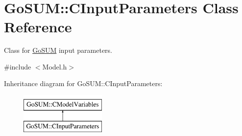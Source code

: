 \hypertarget{class_go_s_u_m_1_1_c_input_parameters}{\section{Go\-S\-U\-M\-:\-:C\-Input\-Parameters Class Reference}
\label{class_go_s_u_m_1_1_c_input_parameters}
}


Class for \hyperlink{struct_go_s_u_m}{Go\-S\-U\-M} input parameters.  




{\ttfamily \#include $<$Model.\-h$>$}

Inheritance diagram for Go\-S\-U\-M\-:\-:C\-Input\-Parameters\-:\begin{figure}[H]
\begin{center}
\leavevmode
\includegraphics[height=2.000000cm]{class_go_s_u_m_1_1_c_input_parameters}
\end{center}
\end{figure}
